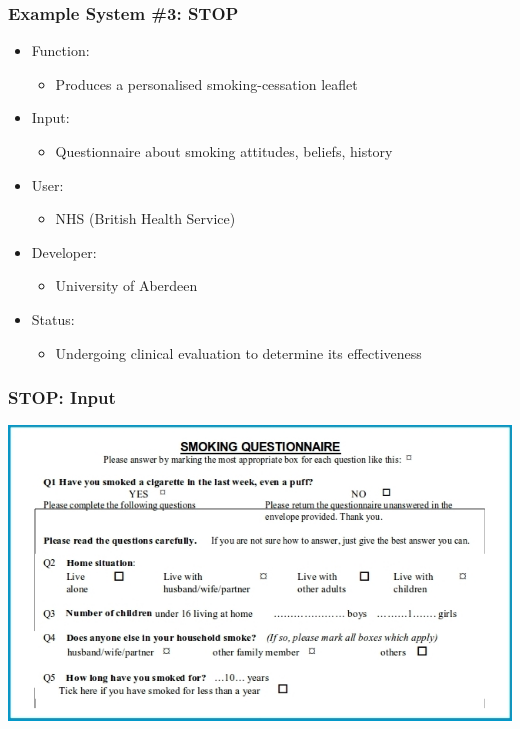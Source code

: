 \documentclass[compress,color=usenames]{beamer}
\begin{document}
\begin{frame}
\frametitle{Example System \#3: STOP}

\label{f28}
\begin{itemize}
\item { {Function: }}
\begin{itemize}
\item Produces a personalised smoking-cessation leaflet
\end{itemize}
\item { {Input: }}
\begin{itemize}
\item Questionnaire about smoking attitudes, beliefs, history
\end{itemize}
\item { {User: }}
\begin{itemize}
\item NHS (British Health Service)
\end{itemize}
\item { {Developer: }}
\begin{itemize}
\item University of Aberdeen 
\end{itemize}
\item { {Status: }}
\begin{itemize}
\item Undergoing clinical evaluation to determine its effectiveness
\end{itemize}
\end{itemize}

\end{frame}

\begin{frame}
\frametitle{STOP: Input}

\begin{center}
\includegraphics[scale=.4]{pics/pic4.jpg}
\end{center}

\end{frame}
\end{document}
